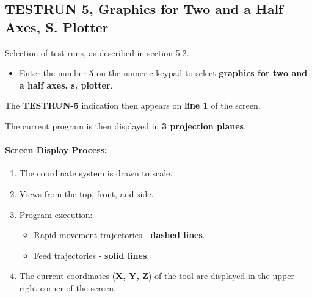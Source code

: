 \vspace{.5cm}

\begin{itemize}
\end{itemize}

\vspace{.5cm}

\begin{itemize}
\end{itemize}

\newpage

\subsection{TESTRUN 5, Graphics for Two and a Half Axes, S. Plotter}

Selection of test runs, as described in section 5.2.

\begin{itemize}
    \item Enter the number \textbf{5} on the numeric keypad to select \textbf{graphics for two and a half axes, s. plotter}.
\end{itemize}

The \textbf{TESTRUN-5} indication then appears on \textbf{line 1} of the screen.

\begin{itemize}
\end{itemize}

\vspace{.5cm}

The current program is then displayed in \textbf{3 projection planes}.

\paragraph{Screen Display Process:}
\begin{enumerate}
    \item The coordinate system is drawn to scale.
    \item Views from the top, front, and side.
    \item Program execution:
    \begin{itemize}
        \item Rapid movement trajectories - \textbf{dashed lines}.
        \item Feed trajectories - \textbf{solid lines}.
    \end{itemize}
    \item The current coordinates (\textbf{X, Y, Z}) of the tool are displayed in the upper right corner of the screen.
\end{enumerate}

